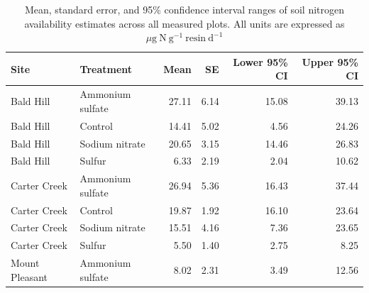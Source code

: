 \newpage
\begin{landscape}
\begin{table}[]
    \caption[Mean, standard error, and 95\% confidence interval ranges of soil nitrogen availability estimates across all measured plots]{Mean, standard error, and 95\% confidence interval ranges of soil nitrogen availability estimates across all measured plots. All units are expressed as $\mu \mathrm{g\ N\ g^{-1}\ resin\ d^{-1}}$}
    \centering
    \label{tab:table.b4}
    \begin{tabular}{p{3cm}p{3.5cm}p{1.5cm}p{1.5cm}p{2.75cm}p{2.75cm}}
        \hline
        Site           & Treatment        & \multicolumn{1}{r}{Mean }   & \multicolumn{1}{r}{SE}    & \multicolumn{1}{r}{Lower 95\% CI} & \multicolumn{1}{r}{Upper 95\% CI} \\
        \hline
        Bald Hill      & Ammonium sulfate & \multicolumn{1}{r}{27.11}   & \multicolumn{1}{r}{6.14}  & \multicolumn{1}{r}{15.08}         & \multicolumn{1}{r}{39.13}  \\
        Bald Hill      & Control          & \multicolumn{1}{r}{14.41}   & \multicolumn{1}{r}{5.02}  & \multicolumn{1}{r}{4.56}          & \multicolumn{1}{r}{24.26}  \\
        Bald Hill      & Sodium nitrate   & \multicolumn{1}{r}{20.65}   & \multicolumn{1}{r}{3.15}  & \multicolumn{1}{r}{14.46}         & \multicolumn{1}{r}{26.83}  \\
        Bald Hill      & Sulfur           & \multicolumn{1}{r}{6.33}    & \multicolumn{1}{r}{2.19}  & \multicolumn{1}{r}{2.04}          & \multicolumn{1}{r}{10.62}  \\
        Carter Creek   & Ammonium sulfate & \multicolumn{1}{r}{26.94}   & \multicolumn{1}{r}{5.36}  & \multicolumn{1}{r}{16.43}         & \multicolumn{1}{r}{37.44}  \\
        Carter Creek   & Control          & \multicolumn{1}{r}{19.87}   & \multicolumn{1}{r}{1.92}  & \multicolumn{1}{r}{16.10}         & \multicolumn{1}{r}{23.64}  \\
        Carter Creek   & Sodium nitrate   & \multicolumn{1}{r}{15.51}   & \multicolumn{1}{r}{4.16}  & \multicolumn{1}{r}{7.36}          & \multicolumn{1}{r}{23.65}  \\
        Carter Creek   & Sulfur           & \multicolumn{1}{r}{5.50}    & \multicolumn{1}{r}{1.40}  & \multicolumn{1}{r}{2.75}          & \multicolumn{1}{r}{8.25}   \\
        Mount Pleasant & Ammonium sulfate & \multicolumn{1}{r}{8.02}    & \multicolumn{1}{r}{2.31}  & \multicolumn{1}{r}{3.49}          & \multicolumn{1}{r}{12.56}  \\

\end{tabular}
\end{table}
\end{landscape}
